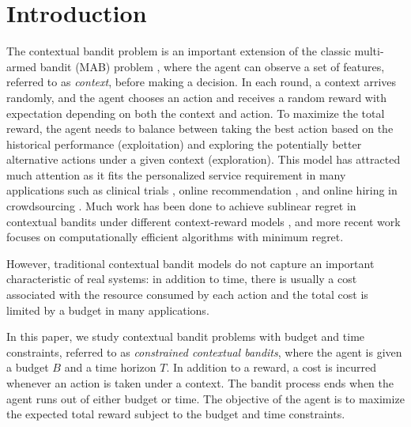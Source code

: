 \section{Introduction} \label{sec:intro}
The contextual bandit problem \cite{Langford2007NIPS,Lu2010ICAIS:CMAB} is an important extension of the classic multi-armed bandit (MAB) problem \cite{Auer2002ML:UCB}, where  the agent can observe a set of features, referred to as \emph{context}, before making a decision.  In each round, a context arrives randomly, and the agent chooses an action and receives a random reward with expectation depending on both the context and action.
To maximize the total reward, {the agent needs to balance between taking the best action based on the historical performance (exploitation) and exploring the potentially better alternative actions under a given context (exploration).}
This model has attracted much attention as it fits the personalized service requirement in many applications such as clinical trials \cite{Lai2012SA}, online recommendation \cite{Li2010WWW:LinUCB,Tang2013CIKM}, and online hiring in crowdsourcing \cite{Hassan2014UIC}.
Much work has been done to achieve sublinear regret in contextual bandits under different context-reward models \cite{Langford2007NIPS,Slivkins2011COLT}, and more recent work \cite{Agarwal2014ICML:CMAB} focuses on computationally efficient algorithms with minimum regret.

However, traditional contextual bandit models do not capture an important characteristic of real systems: in addition to time, there is usually a cost associated with the  resource consumed by each action and the total cost is limited by a budget in many applications. 

In this paper, we study contextual bandit problems with budget and time constraints, referred to as \emph{constrained contextual bandits}, where  the agent is given a budget $B$ and a time horizon $T$.
In addition to a reward, a cost is incurred  whenever an action is taken under a context. The bandit process ends when the agent runs out of either budget or time.
The objective of the agent is to maximize the expected total reward subject to the budget and time constraints.

